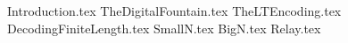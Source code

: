 \documentclass[12pt,a4paper,titlepage]{article}
\begin{document}
\lipsum[1]

{Introduction.tex}
{TheDigitalFountain.tex}
{TheLTEncoding.tex}
{DecodingFiniteLength.tex}
{SmallN.tex}
{BigN.tex}
{Relay.tex}



\end{document}
